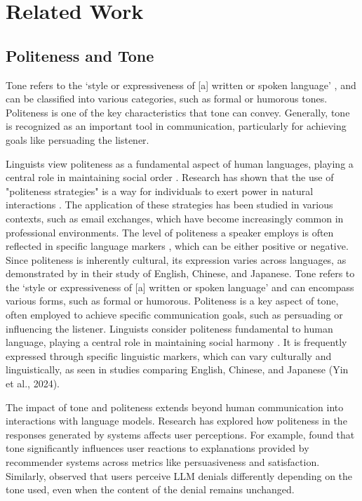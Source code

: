 \documentclass[11pt]{article}
\begin{document}
\section{Related Work}

\subsection{Politeness and Tone}


Tone refers to the `style or expressiveness of [a] written or spoken language' \citep{okoso24-tone-recommenders}, and can be classified into various categories, such as formal or humorous tones. Politeness is one of the key characteristics that tone can convey. Generally, tone is recognized as an important tool in communication, particularly for achieving goals like persuading the listener.

Linguists view politeness as a fundamental aspect of human languages, playing a central role in maintaining social order \citep{li23-how-understand}. Research has shown that the use of "politeness strategies" is a way for individuals to exert power in natural interactions \citep{okoso24-tone-recommenders}. The application of these strategies has been studied in various contexts, such as email exchanges, which have become increasingly common in professional environments. The level of politeness a speaker employs is often reflected in specific language markers \citep{li23-how-understand}, which can be either positive or negative. Since politeness is inherently cultural, its expression varies across languages, as demonstrated by \citep{yin24-should-respect} in their study of English, Chinese, and Japanese.
Tone refers to the `style or expressiveness of [a] written or spoken language' \cite{okoso24-tone-recommenders} and can encompass various forms, such as formal or humorous. Politeness is a key aspect of tone, often employed to achieve specific communication goals, such as persuading or influencing the listener. Linguists consider politeness fundamental to human language, playing a central role in maintaining social harmony \citep{li23-how-understand}. It is frequently expressed through specific linguistic markers, which can vary culturally and linguistically, as seen in studies comparing English, Chinese, and Japanese (Yin et al., 2024).

The impact of tone and politeness extends beyond human communication into interactions with language models. Research has explored how politeness in the responses generated by systems affects user perceptions. For example, \citep{okoso24-tone-recommenders} found that tone significantly influences user reactions to explanations provided by recommender systems across metrics like persuasiveness and satisfaction. Similarly, \citep{joel24-llm-denials} observed that users perceive LLM denials differently depending on the tone used, even when the content of the denial remains unchanged.
\end{document}

